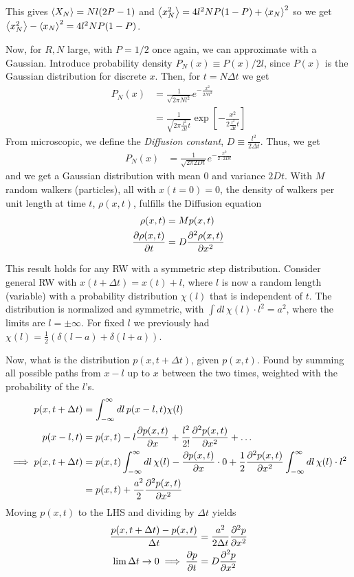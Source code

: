 \documentclass[a4paper, english, 12pt]{article}
\begin{document}
\begin{multicols*}{2}
This gives $\expval{X_N}=Nl(2P-1)$ and $\expval{x_N^2}=4l^2 NP(1-P) + \expval{x_N}^2$ so we get $\expval{x_N^2} - \expval{x_N}^2 = 4l^2 N P(1-P)$.

Now, for $R,N$ large, with $P=1/2$ once again, we can approximate with a Gaussian. Introduce probability density $P_N(x)\equiv P(x)/2l$, since $P(x)$ is the Gaussian distribution for discrete $x$. Then, for $t=N\Delta t$ we get 
\begin{align*}
    P_N(x) &= \frac{1}{\sqrt{2\pi Nl^2}} e^{-\frac{x^2}{2Nl^2}} \\ 
    &= \frac{1}{\sqrt{2\pi \frac{l^2}{\Delta t} t}} \exp[-\frac{x^2}{2\frac{l^2}{\Delta t} t}]
\end{align*}  
From microscopic, we define the \textit{Diffusion constant}, $D\equiv \frac{l^2}{2\Delta t}$. Thus, we get 
\begin{align*}
    P_N(x) &= \frac{1}{\sqrt{2\pi 2Dt}} e^{-\frac{x^2}{2\cdot 2Dt}}
\end{align*}
and we get a Gaussian distribution with mean $0$ and variance $2Dt$. With $M$ random walkers (particles), all with $x(t=0)=0$, the density of walkers per unit length at time $t$, $\rho(x,t)$, fulfills the Diffusion equation 
\begin{align*}
    \rho(x,t) &= M p(x,t) \\ 
    \pdv{\rho(x,t)}{t} &= D \pdv[2]{\rho(x,t)}{x}
\end{align*}


This result holds for any RW with a symmetric step distribution. Consider general RW with $x(t+\Delta t)=x(t)+l$, where $l$ is now a random length (variable) with a probability distribution $\chi(l)$ that is independent of $t$. The distribution is normalized and symmetric, with $\int dl\,\chi(l)\cdot l^2=a^2$, where the limits are $l=\pm\infty$. For fixed $l$ we previously had $\chi(l)=\frac{1}{2}(\delta(l-a) + \delta(l+a))$. 

Now, what is the distribution $p(x,t+\Delta t)$, given $p(x,t)$. Found by summing all possible paths from $x-l$ up to $x$ between the two times, weighted with the probability of the $l$'s. 
\begin{align*}
    p(x,t+\Delta t) &= \int_{-\infty}^\infty dl\, p(x-l,t)\chi(l) \\ 
    p(x-l,t) &= p(x,t) - l \pdv{p(x,t)}{x} + \frac{l^2}{2!}\pdv[2]{p(x,t)}{x} + \dots \\ 
    \implies p(x,t+\Delta t) &= p(x,t)\int_{-\infty}^\infty dl\,\chi(l) - \pdv{p(x,t)}{x} \cdot 0 + \frac{1}{2} \pdv[2]{p(x,t)}{x} \int_{-\infty}^\infty dl\,\chi(l)\cdot l^2 \\ 
    &= p(x,t) + \frac{a^2}{2} \pdv[2]{p(x,t)}{x}
\end{align*}
Moving $p(x,t)$ to the LHS and dividing by $\Delta t$ yields 
\begin{align*}
    \frac{p(x,t+\Delta t) - p(x,t)}{\Delta t} &= \frac{a^2}{2\Delta t} \pdv[2]{p}{x} \\ 
    \lim \Delta t\to 0 \implies \pdv{p}{t} &= D \pdv[2]{p}{x}
\end{align*}

\end{multicols*}
\end{document}

